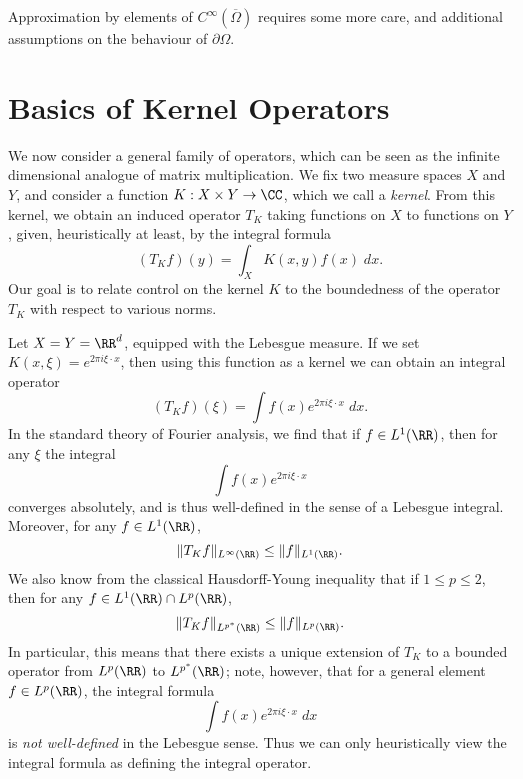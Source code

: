 Approximation by elements of $C^\infty(\overline{\Omega})$ requires some more care, and additional assumptions on the behaviour of $\partial \Omega$.











\chapter{Basics of Kernel Operators}

We now consider a general family of operators, which can be seen as the infinite dimensional analogue of matrix multiplication. We fix two measure spaces $X$ and $Y$, and consider a function $K: X \times Y \to \CC$, which we call a \emph{kernel}. From this kernel, we obtain an induced operator $T_K$ taking functions on $X$ to functions on $Y$, given, heuristically at least, by the integral formula
%
\[ (T_K f)(y) = \int_X K(x,y) f(x)\; dx. \]
%
Our goal is to relate control on the kernel $K$ to the boundedness of the operator $T_K$ with respect to various norms.

\begin{example}
  Let $X = Y = \RR^d$, equipped with the Lebesgue measure. If we set $K(x,\xi) = e^{2 \pi i \xi \cdot x}$, then using this function as a kernel we can obtain an integral operator
  \[ (T_K f)(\xi) = \int f(x) e^{2 \pi i \xi \cdot x}\; dx. \]
  In the standard theory of Fourier analysis, we find that if $f \in L^1(\RR)$, then for any $\xi$ the integral
  \[ \int f(x) e^{2 \pi i \xi \cdot x} \]
  converges absolutely, and is thus well-defined in the sense of a Lebesgue integral. Moreover, for any $f \in L^1(\RR)$,
  \[ \| T_K f \|_{L^\infty(\RR)} \leq \| f \|_{L^1(\RR)}. \]
  We also know from the classical Hausdorff-Young inequality that if $1 \leq p \leq 2$, then for any $f \in L^1(\RR) \cap L^p(\RR)$,
  \[ \| T_K f \|_{L^{p^*}(\RR)} \leq \| f \|_{L^p(\RR)}. \]
  In particular, this means that there exists a unique extension of $T_K$ to a bounded operator from $L^p(\RR)$ to $L^{p^*}(\RR)$; note, however, that for a general element $f \in L^p(\RR)$, the integral formula
  \[ \int f(x) e^{2 \pi i \xi \cdot x}\; dx \]
  is \emph{not well-defined} in the Lebesgue sense. Thus we can only heuristically view the integral formula as defining the integral operator.
\end{example}

